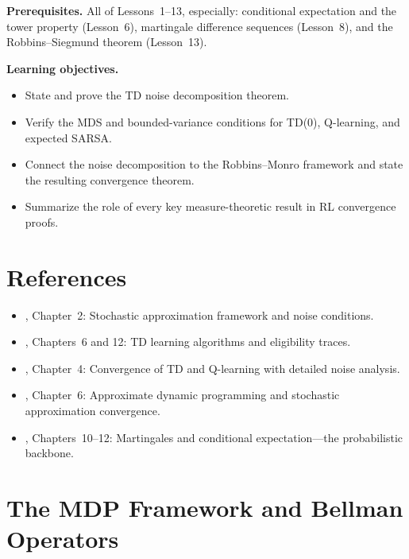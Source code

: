 \documentclass[11pt,a4paper]{article}
\begin{document}
\medskip
\noindent\textbf{Prerequisites.}
All of Lessons~1--13, especially: conditional expectation and the
tower property (Lesson~6), martingale difference sequences
(Lesson~8), and the Robbins--Siegmund theorem (Lesson~13).

\noindent\textbf{Learning objectives.}
\begin{itemize}[nosep]
  \item State and prove the TD noise decomposition theorem.
  \item Verify the MDS and bounded-variance conditions for
    TD(0), Q-learning, and expected SARSA.
  \item Connect the noise decomposition to the Robbins--Monro
    framework and state the resulting convergence theorem.
  \item Summarize the role of every key measure-theoretic
    result in RL convergence proofs.
\end{itemize}


\section{References}
\label{sec:references}

\begin{itemize}[nosep]
  \item \citet{borkar2008}, Chapter~2: Stochastic approximation
    framework and noise conditions.
  \item \citet{sutton2018}, Chapters~6 and 12: TD learning
    algorithms and eligibility traces.
  \item \citet{szepesvari2010}, Chapter~4: Convergence of TD
    and Q-learning with detailed noise analysis.
  \item \citet{bertsekas2012}, Chapter~6: Approximate dynamic
    programming and stochastic approximation convergence.
  \item \citet{williams1991}, Chapters~10--12: Martingales and
    conditional expectation---the probabilistic backbone.
\end{itemize}


\section{The MDP Framework and Bellman Operators}
\label{sec:mdp}
\end{document}
